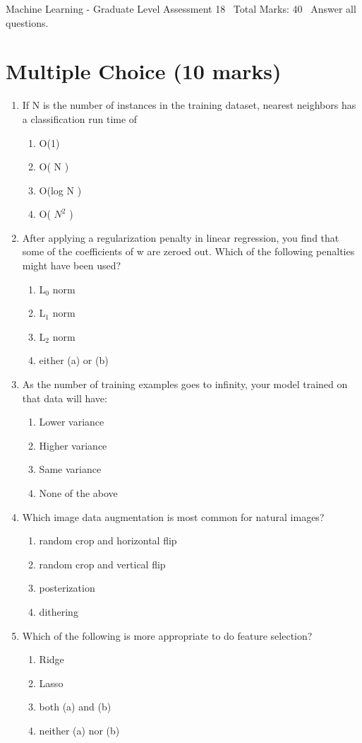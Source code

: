 \documentclass[12pt]{article}
\begin{document}
\begin{center}
Machine Learning - Graduate Level Assessment 18 \
Total Marks: 40 \
Answer all questions.
\end{center}

\section*{Multiple Choice (10 marks)}
\begin{enumerate}[label=\arabic*.]
\item If N is the number of instances in the training dataset, nearest neighbors has a classification run time of
\begin{enumerate}[label=(\alph*)]
    \item O(1)
    \item O( N )
    \item O(log N )
    \item O( $N^2$ )
\end{enumerate}
\item After applying a regularization penalty in linear regression, you find that some of the coefficients of w are zeroed out. Which of the following penalties might have been used?
\begin{enumerate}[label=(\alph*)]
    \item L$_{0}$ norm
    \item L$_{1}$ norm
    \item L$_{2}$ norm
    \item either (a) or (b)
\end{enumerate}
\item As the number of training examples goes to infinity, your model trained on that data will have:
\begin{enumerate}[label=(\alph*)]
    \item Lower variance
    \item Higher variance
    \item Same variance
    \item None of the above
\end{enumerate}
\item Which image data augmentation is most common for natural images?
\begin{enumerate}[label=(\alph*)]
    \item random crop and horizontal flip
    \item random crop and vertical flip
    \item posterization
    \item dithering
\end{enumerate}
\item Which of the following is more appropriate to do feature selection?
\begin{enumerate}[label=(\alph*)]
    \item Ridge
    \item Lasso
    \item both (a) and (b)
    \item neither (a) nor (b)
\end{enumerate}
\end{enumerate}
\end{document}
